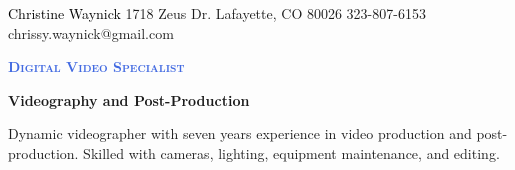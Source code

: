 \documentclass[letterpaper, 11pt]{article}
\newcommand{\CawColorName}{Black}
\newcommand{\CawColorTitle}{RoyalBlue}
\begin{document}
%
\cawtitle
{\textcolor{\CawColorName}{Christine Waynick}}
{1718 Zeus Dr.}
{Lafayette, CO 80026}
{323-807-6153}
{chrissy.waynick@gmail.com}
%
\begin{center}\par\smallskip
\textcolor{\CawColorTitle}{\Large \textbf{\textsc{Digital Video Specialist}}}\par
\large \textbf{{Videography and Post-Production}}\par
\smallskip
\noindent \begin{minipage}[t]{0.75\textwidth}%
\begin{sloppypar}
Dynamic videographer with seven years experience in video production and
post-production. Skilled with cameras, lighting, equipment maintenance, and editing.
\end{sloppypar}
\end{minipage}
\end{center}
\par \smallskip \smallskip

\end{document}
